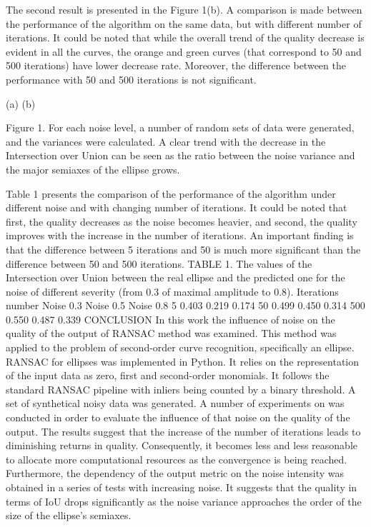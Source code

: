 The second result is presented in the Figure 1(b). A comparison is made between the performance of the algorithm on the same data, but with different number of iterations. It could be noted that while the overall trend of the quality decrease is evident in all the curves, the orange and green curves (that correspond to 50 and 500 iterations) have lower decrease rate. Moreover, the difference between the performance with 50 and 500 iterations is not significant.

	
(a)	(b)
	
Figure 1. For each noise level, a number of random sets of data were generated, and the variances were calculated. A clear trend with the decrease in the Intersection over Union can be seen as the ratio between the noise variance and the major semiaxes of the ellipse grows.



Table 1 presents the comparison of the performance of the algorithm under different noise and with changing number of iterations. It could be noted that first, the quality decreases as the noise becomes heavier, and second, the quality improves with the increase in the number of iterations. An important finding is that the difference between 5 iterations and 50 is much more significant than the difference between 50 and 500 iterations.
TABLE 1. The values of the Intersection over Union between the real ellipse and the predicted one for the noise of different severity (from 0.3 of maximal amplitude to 0.8).	
Iterations number	Noise 0.3	Noise 0.5	Noise 0.8
5	0.403	0.219	0.174
50	0.499	0.450	0.314
500	0.550	0.487	0.339
CONCLUSION
In this work the influence of noise on the quality of the output of RANSAC method was examined. This method was applied to the problem of second-order curve recognition, specifically an ellipse. RANSAC for ellipses was implemented in Python. It relies on the representation of the input data as zero, first and second-order monomials. It follows the standard RANSAC pipeline with inliers being counted by a binary threshold.
A set of synthetical noisy data was generated. A number of experiments on was conducted in order to evaluate the influence of that noise on the quality of the output. The results suggest that the increase of the number of iterations leads to diminishing returns in quality. Consequently, it becomes less and less reasonable to allocate more computational resources as the convergence is being reached.
Furthermore, the dependency of the output metric on the noise intensity was obtained in a series of tests with increasing noise. It suggests that the quality in terms of IoU drops significantly as the noise variance approaches the order of the size of the ellipse’s semiaxes.

